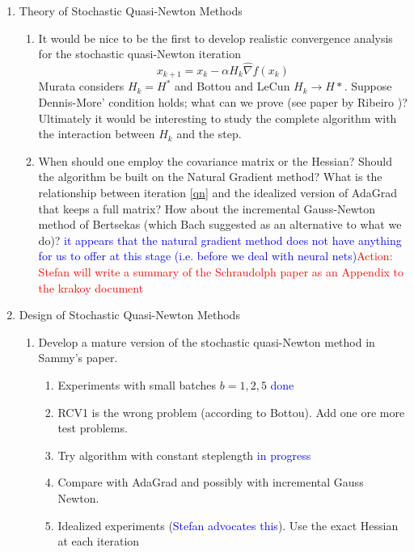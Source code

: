 \documentclass[12pt]{article}
\begin{document}
\begin{enumerate}
\item Theory of Stochastic Quasi-Newton Methods
\begin{enumerate}
	\item It would be nice to be the first to develop realistic convergence analysis for the stochastic quasi-Newton iteration
	\begin{equation}
	         x_{k+1}= x_k - \alpha H_k \widehat \nabla f(x_k)    \label{qn}
	 \end{equation}
	  Murata considers $H_k = H^*$ and Bottou and LeCun $H_k \rightarrow H*$.  Suppose Dennis-More' condition holds; what
	     can we prove (see paper by Ribeiro \cite{mokhtariregularized})? Ultimately it would be interesting to study the complete
	     algorithm with the interaction between $H_k$ and the step.
	  	\item When should one employ the covariance matrix or the Hessian? Should the algorithm be built on the Natural Gradient
	        method?  What is the relationship between
	         iteration \eqref{qn} and the idealized version of AdaGrad that keeps a full matrix?  How about the incremental 
	         Gauss-Newton method of Bertsekas (which Bach suggested as an alternative to what we do)? \textcolor{blue}{ it
	         appears that the natural gradient method does not have anything for us to offer at this stage (i.e. before we
	         deal with neural nets)}\textcolor{red}{Action: Stefan will write a summary of the Schraudolph paper as an Appendix
	         to the krakoy document}
	         	\end{enumerate}         
\item Design of Stochastic Quasi-Newton Methods
\begin{enumerate}
	\item Develop a mature version of
	        the stochastic quasi-Newton method in Sammy's paper.
	\begin{enumerate}
		\item Experiments with small batches $b=1,2, 5$ \textcolor{blue}{done}
		\item RCV1 is the wrong problem (according to Bottou). Add one ore more test problems.
		\item Try algorithm with constant steplength \textcolor{blue}{in progress}
		\item Compare with AdaGrad and possibly with incremental Gauss Newton.
		\item Idealized experiments (\textcolor{blue}{Stefan advocates this}). Use the exact Hessian at each iteration 

\end{enumerate}
\end{enumerate}
\end{enumerate}
\end{document}

